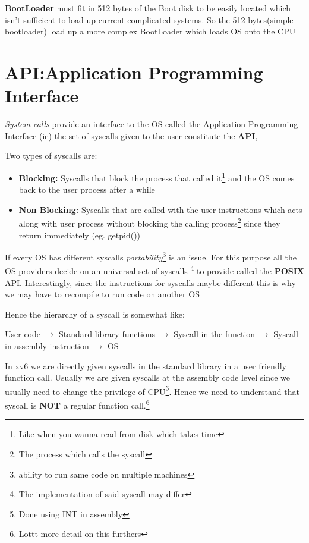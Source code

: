 \documentclass[12pt]{article}
\newcommand{\tbox}[1]{\noindent\fbox{\parbox{\textwidth}{#1}}}
\begin{document}
    \textbf{BootLoader} must fit in 512 bytes of the Boot disk to be easily located which isn't sufficient to load up current complicated systems.
    So the 512 bytes(simple bootloader) load up a more complex BootLoader which loads OS onto the CPU 

\noindent\tbox{
    \begin{center}
    \textbf{\Huge Lecture 3}
    \end{center}
}
\section{API:Application Programming Interface}
\textit{System calls} provide an interface to the OS called the Application Programming Interface (ie) the set of syscalls given
to the user constitute the \textbf{API},

Two types of syscalls are:
\begin{itemize}[topsep=0pt, partopsep=0pt, itemsep=0pt, parsep=0pt]
    \item \textbf{Blocking:} Syscalls that block the process that called it\footnote{Like when you wanna read from disk which takes time} and the OS comes back to the user process after a while
    \item \textbf{Non Blocking:} Syscalls that are called with the user instructions which acts along with user process without blocking the calling process\footnote{The process which calls the syscall} since they return immediately (eg. getpid())
\end{itemize}


If every OS has different syscalls \textit{portability}\footnote{ability to run same code on multiple machines} is an issue. For this purpose all the OS providers decide on an universal set of syscalls
\footnote{The implementation of said syscall may differ} to provide called the \textbf{POSIX} API. Interestingly, since the instructions for syscalls maybe different this is why we may have to recompile to run code on another OS

Hence the hierarchy of a syscall is somewhat like:
\begin{center}
    User code $\rightarrow$ Standard library functions $\rightarrow$ Syscall in the function $\rightarrow$ Syscall in assembly instruction $\rightarrow$ OS
\end{center}

In xv6 we are directly given syscalls in the standard library in a user friendly function call. Usually we are given syscalls at the assembly code level
since we usually need to change the privilege of CPU\footnote{Done using INT in assembly}. Hence we need to understand that syscall is \textbf{NOT} a regular function call.\footnote{Lottt more detail on this furthers}
\end{document}
